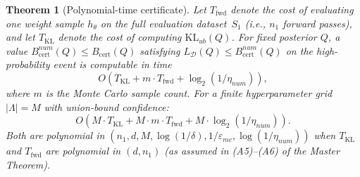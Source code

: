 \documentclass[11pt,a4paper]{article}
\newtheorem{theorem}{Theorem}
\newcommand{\KL}{\mathrm{KL}}
\newcommand{\cD}{\mathcal{D}}
\begin{document}
\begin{theorem}[Polynomial-time certificate]
\label{thm:polytime}
Let $T_{\mathrm{fwd}}$ denote the cost of evaluating one weight sample $h_\theta$ on the full evaluation dataset~$S_1$ (i.e., $n_1$ forward passes), and let $T_{\mathrm{KL}}$ denote the cost of computing $\KL_{ub}(Q)$. For fixed posterior $Q$, a value $B_{\mathrm{cert}}^{num}(Q) \le B_{\mathrm{cert}}(Q)$ satisfying $L_\cD(Q) \le B_{\mathrm{cert}}^{num}(Q)$ on the high-probability event is computable in time
\[
O\!\left(T_{\mathrm{KL}} + m \cdot T_{\mathrm{fwd}} + \log_2(1/\eta_{num})\right),
\]
where $m$ is the Monte Carlo sample count. For a finite hyperparameter grid $|\Lambda| = M$ with union-bound confidence:
\[
O\!\left(M \cdot T_{\mathrm{KL}} + M \cdot m \cdot T_{\mathrm{fwd}} + M \cdot \log_2(1/\eta_{num})\right).
\]
Both are polynomial in $(n_1, d, M, \log(1/\delta), 1/\varepsilon_{mc}, \log(1/\eta_{num}))$ when $T_{\mathrm{KL}}$ and $T_{\mathrm{fwd}}$ are polynomial in $(d, n_1)$ (as assumed in (A5)--(A6) of the Master Theorem).
\end{theorem}
\end{document}
